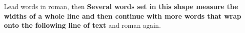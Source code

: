 \documentclass{article}
\begin{document}
Lead words in roman, then \textsf{\textbf{Several words set in this shape measure the widths of a whole line and then continue with more words that wrap onto the following line of text}} and roman again.
\end{document}
